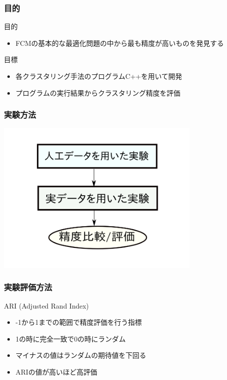 \documentclass[13pt,dvipdfmx]{beamer}
\begin{document}
\begin{frame}\frametitle{目的}
\begin{block}{目的}
\begin{itemize}
 \item FCMの基本的な最適化問題の中から最も精度が高いものを発見する
\end{itemize}
\end{block}
\vspace{4mm}
\begin{block}{目標}
\begin{itemize}
 \item 各クラスタリング手法のプログラムC++を用いて開発
 \item プログラムの実行結果からクラスタリング精度を評価
\end{itemize}
\end{block}
\end{frame}

\begin{frame}\frametitle{実験方法}
\begin{center}
 \includegraphics[width=100mm]{experiment.png}
\end{center}
\end{frame}

\begin{frame}\frametitle{実験評価方法}
\begin{block}{ARI (Adjusted Rand Index)}
\begin{itemize}
 \item -1から1までの範囲で精度評価を行う指標
 \item 1の時に完全一致で0の時にランダム
 \item マイナスの値はランダムの期待値を下回る
 \item ARIの値が高いほど高評価
\end{itemize}
\end{block}
\begin{center}
\end{center}
\end{frame}
\end{document}
